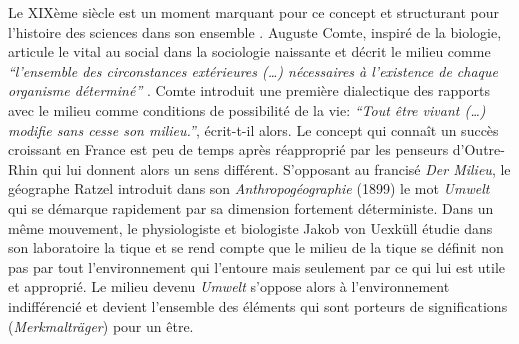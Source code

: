 Le XIXème siècle est un moment marquant pour ce concept et structurant pour l’histoire des sciences dans son ensemble \citep{Taylan2010}. Auguste Comte, inspiré de la biologie, articule le vital au social dans la sociologie naissante et décrit le milieu comme \textit{``l’ensemble des circonstances extérieures (…) nécessaires à l’existence de chaque organisme déterminé''} \citep{Comte1838}. Comte introduit une première dialectique des rapports avec le milieu comme conditions de possibilité de la vie: \textit{``Tout être vivant (…) modifie sans cesse son milieu.''}, écrit-t-il alors. Le concept qui connaît un succès croissant en France est peu de temps après réapproprié par les penseurs d’Outre-Rhin qui lui donnent alors un sens différent. S’opposant au francisé \textit{Der Milieu}, le géographe Ratzel introduit dans son \textit{Anthropogéographie} (1899) le mot \textit{Umwelt} qui se démarque rapidement par sa dimension fortement déterministe. Dans un même mouvement, le physiologiste et biologiste Jakob von Uexküll étudie dans son laboratoire la tique et se rend compte que le milieu de la tique se définit non pas par tout l’environnement qui l’entoure mais seulement par ce qui lui est utile et approprié. Le milieu devenu \textit{Umwelt} s’oppose alors à l’environnement indifférencié et devient l’ensemble des éléments qui sont porteurs de significations (\textit{Merkmalträger}) pour un être. 

